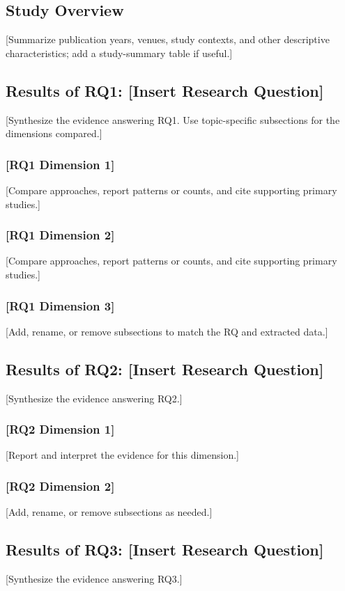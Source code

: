 \documentclass[11pt]{article}
\begin{document}
\subsection{Study Overview}
[Summarize publication years, venues, study contexts, and other descriptive characteristics; add a study-summary table if useful.]

\subsection{Results of RQ1: [Insert Research Question]}
[Synthesize the evidence answering RQ1. Use topic-specific subsections for the dimensions compared.]

\subsubsection{[RQ1 Dimension 1]}
[Compare approaches, report patterns or counts, and cite supporting primary studies.]

\subsubsection{[RQ1 Dimension 2]}
[Compare approaches, report patterns or counts, and cite supporting primary studies.]

\subsubsection{[RQ1 Dimension 3]}
[Add, rename, or remove subsections to match the RQ and extracted data.]

\subsection{Results of RQ2: [Insert Research Question]}
[Synthesize the evidence answering RQ2.]

\subsubsection{[RQ2 Dimension 1]}
[Report and interpret the evidence for this dimension.]

\subsubsection{[RQ2 Dimension 2]}
[Add, rename, or remove subsections as needed.]

\subsection{Results of RQ3: [Insert Research Question]}
[Synthesize the evidence answering RQ3.]
\end{document}
